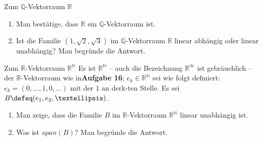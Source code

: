 \documentclass{uebblatt}
\begin{document}
\begin{aufgabe}{Zum $\mathbb{Q}$-Vektorraum $\mathbb{R}$}
\begin{enumerate}
\item Man bestätige, dass $\mathbb{R}$ ein $\mathbb{Q}$-Vektorraum ist.
\item Ist die Familie $(1, \sqrt{2}, \sqrt{3})$ im $\mathbb{Q}$-Vektorraum $\mathbb{R}$ linear abhängig oder linear unabhängig? Man begründe die Antwort.
\end{enumerate}
\end{aufgabe}


\begin{aufgabe}{Zum $\mathbb{R}$-Vektorraum $\mathbb{R}^\mathbb{N}$}
Es ist $\mathbb{R}^\mathbb{N}$ – auch die Bezeichnung $\mathbb{R}^\infty$ ist gebräuchlich – der $\mathbb{R}$-Vektorraum wie in\break\textbf{Aufgabe 16}; $e_k \in \mathbb{R}^\mathbb{N}$ sei wie folgt definiert: $e_k =  (0, … ,1,0,…)$ mit der $1$ an der\break k-ten Stelle. Es sei $B \defeq (e_1 ,e_2 ,…)$.
\begin{enumerate}
\item Man zeige, dass die Familie $B$ im $\mathbb{R}$-Vektorraum $\mathbb{R}^\mathbb{N}$ linear unabhängig ist.
\item Was ist $span(B)$? Man begründe die Antwort.
\end{enumerate}
\end{aufgabe}
\end{document}

